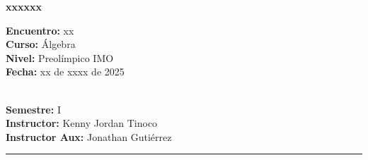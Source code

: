 
\begin{center}
    \textbf{\Large xxxxxx}
\end{center}

\begin{multicols}{2}
{
    \textbf{Encuentro:} xx\\
    \textbf{Curso:} Álgebra\\
    \textbf{Nivel:} Preolímpico IMO\\
    \textbf{Fecha:} xx de xxxx de 2025\\
    \begin{flushright}
        \ \\
        \textbf{Semestre:} I\\
        \textbf{Instructor:} Kenny Jordan Tinoco\\
        \textbf{Instructor Aux:} Jonathan Gutiérrez
    \end{flushright}
}
\end{multicols}
\hrule
\tableofcontents

\thispagestyle{first-page-style}